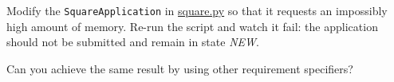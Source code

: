 \documentclass[english,serif,mathserif,xcolor=pdftex,dvipsnames,table]{beamer}
\begin{document}
\begin{frame}
  \begin{exercise}
    Modify the \texttt{SquareApplication} in
    \href{https://github.com/uzh/gc3pie/blob/master/docs/programmers/tutorials/bottom-up/square.py}{square.py}
    so that it requests an impossibly high amount of memory. Re-run
    the script and watch it fail: the application should not be
    submitted and remain in state \emph{NEW}.

    \+
    Can you achieve the same result by using other requirement specifiers?
  \end{exercise}
\end{frame}
\end{document}
